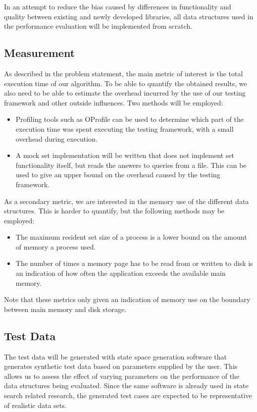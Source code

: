 \documentclass{acm_proc_article-sp}
\begin{document}
In an attempt to reduce the bias caused by differences in functionality and quality between existing and newly developed libraries, all data structures used in the performance evaluation will be implemented from scratch.

\subsection{Measurement}
As described in the problem statement, the main metric of interest is the total execution time of our algorithm. To be able to quantify the obtained results, we also need to be able to estimate the overhead incurred by the use of our testing framework and other outside influences. Two methods will be employed:
\begin{itemize}
\item Profiling tools such as OProfile \cite{oprofile} can be used to determine which part of the execution time was spent executing the testing framework, with a small overhead during execution.
\item A mock set implementation will be written that does not implement set functionality itself, but reads the answers to queries from a file. This can be used to give an upper bound on the overhead caused by the testing framework.
\end{itemize}

As a secondary metric, we are interested in the memory use of the different data structures. This is harder to quantify, but the following methods may be employed:
\begin{itemize}
\item The maximum resident set size of a process is a lower bound on the amount of memory a process used.
\item The number of times a memory page has to be read from or written to disk is an indication of how often the application exceeds the available main memory.
\end{itemize}
Note that these metrics only given an indication of memory use on the boundary between main memory and disk storage.

\subsection{Test Data}
The test data will be generated with state space generation software that generates synthetic test data based on parameters supplied by the user. This allows us to assess the effect of varying parameters on the performance of the data structures being evaluated. Since the same software is already used in state search related research, the generated test cases are expected to be representative of realistic data sets.
\end{document}
